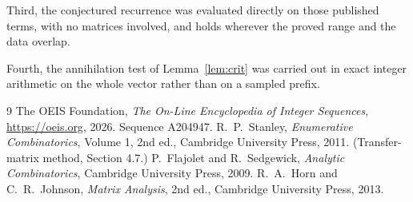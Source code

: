 \documentclass[11pt,a4paper]{article}
\theoremstyle{plain}
\theoremstyle{definition}
\begin{document}
Third, the conjectured recurrence was evaluated directly on those published terms, with no
matrices involved, and holds wherever the proved range and the data overlap.

Fourth, the annihilation test of Lemma~\ref{lem:crit} was carried out in exact integer
arithmetic on the whole vector rather than on a sampled prefix.

\begin{thebibliography}{9}
 The OEIS Foundation, \emph{The On-Line Encyclopedia of Integer
Sequences}, \url{https://oeis.org}, 2026. Sequence A204947.
 R.~P.~Stanley, \emph{Enumerative Combinatorics}, Volume 1, 2nd ed.,
Cambridge University Press, 2011. (Transfer-matrix method, Section 4.7.)
 P.~Flajolet and R.~Sedgewick, \emph{Analytic Combinatorics}, Cambridge
University Press, 2009.
 R.~A.~Horn and C.~R.~Johnson, \emph{Matrix Analysis}, 2nd ed., Cambridge
University Press, 2013.
\end{thebibliography}
\end{document}
